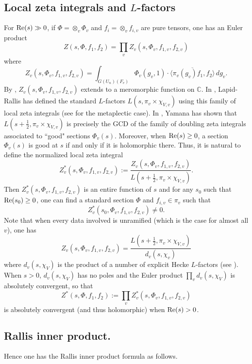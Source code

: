 \documentclass[10pt]{amsart}
\theoremstyle{plain}
\numberwithin{equation}{section}
\begin{document}
\subsection{\bf Local zeta integrals and $L$-factors}
For ${\rm Re}(s) \gg 0$, if $\Phi = \otimes_v \Phi_v$ and $f_i =
\otimes_v f_{i,v}$ are pure tensors, one has an Euler product
\[ Z(s, \Phi, f_1, f_2)  = \prod_v Z_v(s, \Phi_v, f_{1,v}, f_{2,v}) \]
 where
 \[  Z_v(s, \Phi_v, f_{1,v}, f_{2,v}) = \int_{G(U_n)(F_v)} \Phi_v(
 g_v,1) \cdot \overline{ \langle \pi_v(g_v)  f_1, f_2 \rangle} 
 \, dg_v. \]
 By \cite{PS-R87}, $Z_v(s, \Phi_v, f_{1,v}, f_{2,v})$ extends to a meromorphic function on ${\mathbb C}$. 
 In \cite{LR}, Lapid-Rallis has defined the standard $L$-factors $L(s,
 \pi_v \times \chi_{V,v})$ using this family of local zeta integrals
 (see \cite{G} for the metaplectic case). In \cite{Y4}, Yamana has
 shown that $L(s + \frac{1}{2}, \pi_v \times \chi_{V,v})$ is precisely
 the GCD of the family of doubling zeta integrals associated to ``good"
 sections $\Phi_v(s)$. Moreover, when ${\rm Re}(s) \geq 0$, a section
 $\Phi_v(s)$ is good at $s$ if and only if it is holomorphic there.
  Thus, it is natural to define the normalized
 local zeta integral
 \[  
 Z^*_v(s, \Phi_v, f_{1,v}, f_{2,v}) := \frac{Z_v(s, \Phi_v, f_{1,v},
   f_{2,v})}{L(s+ \frac{1}{2}, \pi_v \times \chi_{V,v})}. \]
Then $ Z^*_v(s, \Phi_v, f_{1,v}, f_{2,v})$ is an entire function of
$s$ and for any $s_0$ such that ${\rm Re}(s_0) \geq 0$, one can find a
standard section $\Phi$ and $f_{i,v} \in \pi_v$ such that
 \[ Z^*_v(s_0, \Phi_v, f_{1,v}, f_{2,v}) \ne 0. \] 
Note that when every data involved is unramified (which is the case
 for almost all $v$), one has
 \[   Z_v(s, \Phi_v, f_{1,v}, f_{2,v}) = \frac{L(s+ \frac{1}{2}, \pi_v
   \times \chi_{V,v})}{d_v(s,\chi_v)} \]
 where $d_v(s,\chi_V)$ is the product of a number of explicit Hecke
 $L$-factors (see \cite[P. 334, Remark 3]{LR}). When $s > 0$, $d_v(s,
 \chi_V)$ has no poles and
  the Euler product $\prod_v d_v(s,\chi_V)$ is absolutely convergent,
  so that 
\begin{equation}\label{E:Z^*}
Z^*(s, \Phi, f_1, f_2) := \prod_v Z^*_v(s, \Phi_v, f_{1,v}, f_{2,v})
\end{equation}
 is absolutely convergent (and thus holomorphic)  when ${\rm Re}(s) > 0$. 
  \vskip 5pt

\subsection{\bf Rallis inner product.} Hence one has  the Rallis inner
product formula as follows.
\vskip 5pt
\end{document}
